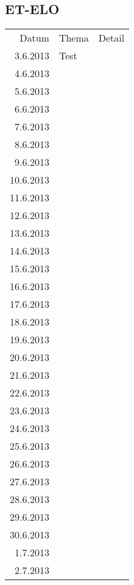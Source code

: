 \subsection{ET-ELO}
\begin{tabular}{r l p{}}
\rowcolor{lgray} Datum     & Thema         & Detail \\
\rowcolor{white}  3.6.2013 & Test          &  \\
\rowcolor{lgray}  4.6.2013 &               &  \\
\rowcolor{white}  5.6.2013 &               &  \\
\rowcolor{lgray}  6.6.2013 &               &  \\
\rowcolor{white}  7.6.2013 &               &  \\
\rowcolor{lgray}  8.6.2013 &               &  \\
\rowcolor{white}  9.6.2013 &               &  \\
\rowcolor{lgray} 10.6.2013 &               &  \\
\rowcolor{white} 11.6.2013 &               &  \\
\rowcolor{lgray} 12.6.2013 &               &  \\
\rowcolor{white} 13.6.2013 &               &  \\
\rowcolor{lgray} 14.6.2013 &               &  \\
\rowcolor{white} 15.6.2013 &               &  \\
\rowcolor{lgray} 16.6.2013 &               &  \\
\rowcolor{white} 17.6.2013 &               &  \\
\rowcolor{lgray} 18.6.2013 &               &  \\
\rowcolor{white} 19.6.2013 &               &  \\
\rowcolor{lgray} 20.6.2013 &               &  \\
\rowcolor{white} 21.6.2013 &               &  \\
\rowcolor{lgray} 22.6.2013 &               &  \\
\rowcolor{white} 23.6.2013 &               &  \\
\rowcolor{lgray} 24.6.2013 &               &  \\
\rowcolor{white} 25.6.2013 &               &  \\
\rowcolor{lgray} 26.6.2013 &               &  \\
\rowcolor{white} 27.6.2013 &               &  \\
\rowcolor{lgray} 28.6.2013 &               &  \\
\rowcolor{white} 29.6.2013 &               &  \\
\rowcolor{lgray} 30.6.2013 &               &  \\
\rowcolor{white}  1.7.2013 &               &  \\
\rowcolor{lgray}  2.7.2013 &               &  \\
\end{tabular}

